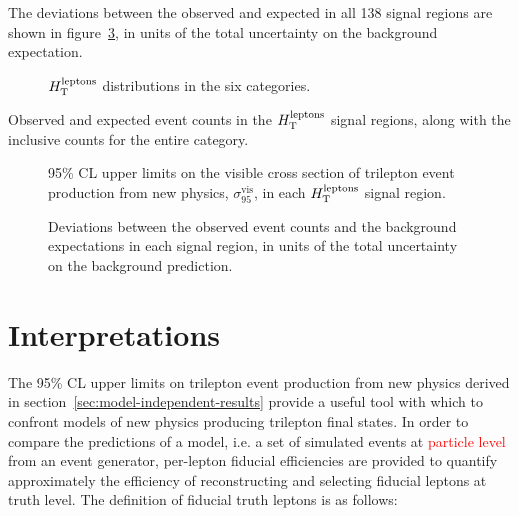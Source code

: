 The deviations between the observed and expected in all 138 signal regions are shown in figure~\ref{fig:model-independent-summary-sigma}, in units of the total uncertainty on the background expectation. 

\begin{figure}[htbp]
	\centering

	\caption{$H_{\mathrm{T}}^{\mathrm{leptons}}$ distributions in the six categories.}
	\label{fig:model-independent-htlep}
\end{figure}

\begin{table}[htbp]
	\centering

	\caption{Observed and expected event counts in the $H_{\mathrm{T}}^{\mathrm{leptons}}$ signal regions, along with the inclusive counts for the entire category.}
	\label{table:model-independent-htlep}
\end{table}

\begin{figure}
	\centering

	\caption{95\% CL upper limits on the visible cross section of trilepton event production from new physics, $\sigma_{95}^{\mathrm{vis}}$, in each $H_{\mathrm{T}}^{\mathrm{leptons}}$ signal region. }
	\label{fig:model-independent-htlep-sigmavis}
\end{figure}

\begin{figure}
	\centering

	\caption{Deviations between the observed event counts and the background expectations in each signal region, in units of the total uncertainty on the background prediction.}
	\label{fig:model-independent-summary-sigma}
\end{figure}



\section{Interpretations}
The 95\% CL upper limits on trilepton event production from new physics derived in section~\ref{sec:model-independent-results} provide a useful tool with which to confront models of new physics producing trilepton final states. In order to compare the predictions of a model, i.e. a set of simulated events at \textcolor{red}{particle level} from an event generator, per-lepton fiducial efficiencies are provided to quantify approximately the efficiency of reconstructing and selecting fiducial leptons at truth level. The definition of fiducial truth leptons is as follows: 

